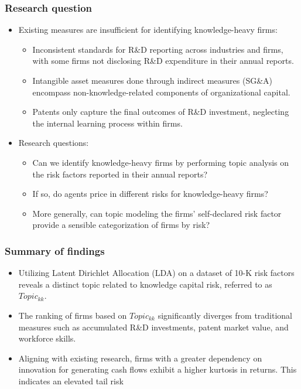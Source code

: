 \documentclass{beamer}
\begin{document}
\begin{frame}
\frametitle{Research question}
  \begin{itemize}
  \item Existing measures are insufficient for identifying knowledge-heavy firms:
\begin{itemize}
\item Inconsistent standards for R\&D reporting across industries and firms, with some firms not disclosing R\&D expenditure in their annual reports.
\item Intangible asset measures done through indirect measures (SG\&A) encompass non-knowledge-related components of organizational capital.
\item Patents only capture the final outcomes of R\&D investment, neglecting the internal learning process within firms.
\end{itemize}
\item Research questions:
\begin{itemize}
\item Can we identify knowledge-heavy firms by performing topic analysis on the risk factors reported in their annual reports?
\item If so, do agents price in different risks for knowledge-heavy firms?
\item More generally, can topic modeling the firms' self-declared risk factor provide a sensible categorization of firms by risk?
\end{itemize}
\end{itemize}
\end{frame}

\begin{frame}
\frametitle{Summary of findings}
\begin{itemize}
	\item Utilizing Latent Dirichlet Allocation (LDA) on a dataset of 10-K risk factors reveals a distinct topic related to knowledge capital risk, referred to as $Topic_{kk}$. %
	\item The ranking of firms based on $Topic_{kk}$ significantly diverges from traditional measures such as accumulated R\&D investments, patent market value, and workforce skills.
	\item  Aligning with existing research, firms with a greater dependency on innovation for generating cash flows exhibit a higher kurtosis in returns. This indicates an elevated tail risk
\end{itemize}
\end{frame}
\end{document}
